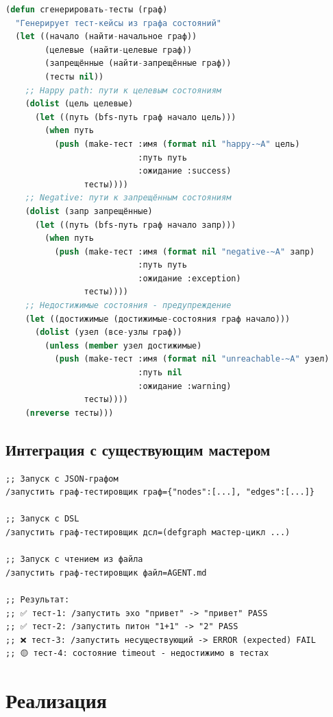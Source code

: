 \documentclass[10pt, oneside]{article}
\begin{document}
\begin{lstlisting}[language=CommonLisp,caption={Алгоритм генерации тестов}]
(defun сгенерировать-тесты (граф)
  "Генерирует тест-кейсы из графа состояний"
  (let ((начало (найти-начальное граф))
        (целевые (найти-целевые граф))
        (запрещённые (найти-запрещённые граф))
        (тесты nil))
    ;; Happy path: пути к целевым состояниям
    (dolist (цель целевые)
      (let ((путь (bfs-путь граф начало цель)))
        (when путь
          (push (make-тест :имя (format nil "happy-~A" цель)
                           :путь путь
                           :ожидание :success)
                тесты))))
    ;; Negative: пути к запрещённым состояниям
    (dolist (запр запрещённые)
      (let ((путь (bfs-путь граф начало запр)))
        (when путь
          (push (make-тест :имя (format nil "negative-~A" запр)
                           :путь путь
                           :ожидание :exception)
                тесты))))
    ;; Недостижимые состояния - предупреждение
    (let ((достижимые (достижимые-состояния граф начало)))
      (dolist (узел (все-узлы граф))
        (unless (member узел достижимые)
          (push (make-тест :имя (format nil "unreachable-~A" узел)
                           :путь nil
                           :ожидание :warning)
                тесты))))
    (nreverse тесты)))
\end{lstlisting}

\subsection{Интеграция с существующим мастером}

\begin{lstlisting}[language={},numbers=none,caption={Пример команд}]
;; Запуск с JSON-графом
/запустить граф-тестировщик граф={"nodes":[...], "edges":[...]}

;; Запуск с DSL
/запустить граф-тестировщик дсл=(defgraph мастер-цикл ...)

;; Запуск с чтением из файла
/запустить граф-тестировщик файл=AGENT.md

;; Результат:
;; ✅ тест-1: /запустить эхо "привет" -> "привет" PASS
;; ✅ тест-2: /запустить питон "1+1" -> "2" PASS
;; ❌ тест-3: /запустить несуществующий -> ERROR (expected) FAIL
;; 🟡 тест-4: состояние timeout - недостижимо в тестах
\end{lstlisting}

\section{Реализация}
\end{document}
